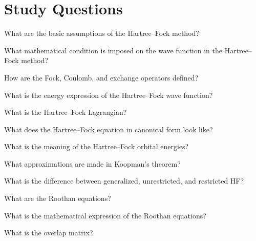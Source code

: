 \documentclass[../Main/chem532-notes.tex]{subfiles}
\begin{document}
\section*{Study Questions}
\begin{myenumerate}
\item What are the basic assumptions of the Hartree--Fock method?
\item What mathematical condition is imposed on the wave function in the Hartree--Fock method?
\item How are the Fock, Coulomb, and exchange operators defined?
\item What is the energy expression of the Hartree--Fock wave function?
\item What is the Hartree--Fock Lagrangian?
\item What does the Hartree--Fock equation in canonical form look like?
\item What is the meaning of the Hartree--Fock orbital energies?
\item What approximations are made in Koopman's theorem?
\item What is the difference between generalized, unrestricted, and restricted HF?
\item What are the Roothan equations?
\item What is the mathematical expression of the Roothan equations?
\item What is the overlap matrix?
\end{myenumerate}
\end{document}
